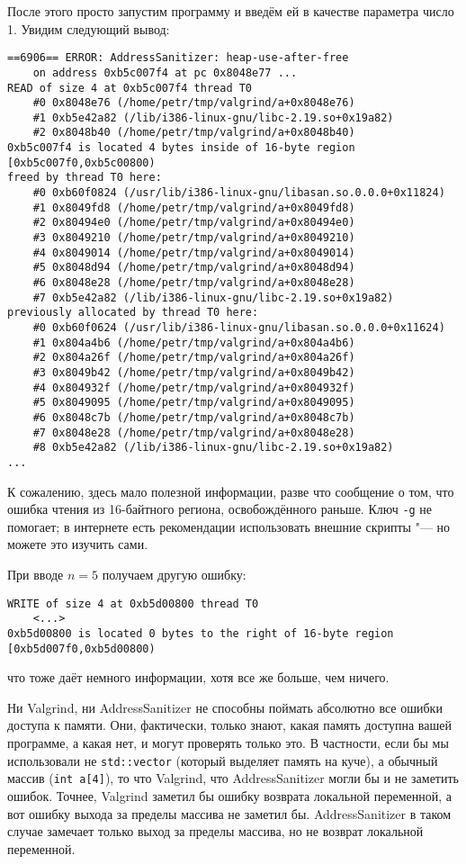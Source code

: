 После этого просто запустим программу и введём ей в качестве параметра число 1. Увидим следующий вывод:
\begin{verbatim}
==6906== ERROR: AddressSanitizer: heap-use-after-free 
    on address 0xb5c007f4 at pc 0x8048e77 ...
READ of size 4 at 0xb5c007f4 thread T0
    #0 0x8048e76 (/home/petr/tmp/valgrind/a+0x8048e76)
    #1 0xb5e42a82 (/lib/i386-linux-gnu/libc-2.19.so+0x19a82)
    #2 0x8048b40 (/home/petr/tmp/valgrind/a+0x8048b40)
0xb5c007f4 is located 4 bytes inside of 16-byte region [0xb5c007f0,0xb5c00800)
freed by thread T0 here:
    #0 0xb60f0824 (/usr/lib/i386-linux-gnu/libasan.so.0.0.0+0x11824)
    #1 0x8049fd8 (/home/petr/tmp/valgrind/a+0x8049fd8)
    #2 0x80494e0 (/home/petr/tmp/valgrind/a+0x80494e0)
    #3 0x8049210 (/home/petr/tmp/valgrind/a+0x8049210)
    #4 0x8049014 (/home/petr/tmp/valgrind/a+0x8049014)
    #5 0x8048d94 (/home/petr/tmp/valgrind/a+0x8048d94)
    #6 0x8048e28 (/home/petr/tmp/valgrind/a+0x8048e28)
    #7 0xb5e42a82 (/lib/i386-linux-gnu/libc-2.19.so+0x19a82)
previously allocated by thread T0 here:
    #0 0xb60f0624 (/usr/lib/i386-linux-gnu/libasan.so.0.0.0+0x11624)
    #1 0x804a4b6 (/home/petr/tmp/valgrind/a+0x804a4b6)
    #2 0x804a26f (/home/petr/tmp/valgrind/a+0x804a26f)
    #3 0x8049b42 (/home/petr/tmp/valgrind/a+0x8049b42)
    #4 0x804932f (/home/petr/tmp/valgrind/a+0x804932f)
    #5 0x8049095 (/home/petr/tmp/valgrind/a+0x8049095)
    #6 0x8048c7b (/home/petr/tmp/valgrind/a+0x8048c7b)
    #7 0x8048e28 (/home/petr/tmp/valgrind/a+0x8048e28)
    #8 0xb5e42a82 (/lib/i386-linux-gnu/libc-2.19.so+0x19a82)
...
\end{verbatim}
К сожалению, здесь мало полезной информации, разве что сообщение о том, что ошибка чтения из 16-байтного региона, освобождённого раньше.
Ключ \verb`-g` не помогает; в интернете есть рекомендации использовать внешние скрипты "--- но можете это изучить сами.

При вводе $n=5$ получаем другую ошибку:
\begin{verbatim}
WRITE of size 4 at 0xb5d00800 thread T0
    <...>
0xb5d00800 is located 0 bytes to the right of 16-byte region [0xb5d007f0,0xb5d00800)
\end{verbatim}
что тоже даёт немного информации, хотя все же больше, чем ничего.

Ни Valgrind, ни AddressSanitizer не способны поймать абсолютно все ошибки доступа к памяти. 
Они, фактически, только знают, какая память доступна вашей программе, а какая нет, и могут проверять только это.
В частности, если бы мы использовали не \verb`std::vector` (который выделяет память на куче), а обычный массив (\verb`int a[4]`), 
то что Valgrind, что AddressSanitizer могли бы и не заметить ошибок. 
Точнее, Valgrind заметил бы ошибку возврата локальной переменной, а вот ошибку выхода за пределы массива не заметил бы.
AddressSanitizer в таком случае замечает только выход за пределы массива, но не возврат локальной переменной.

